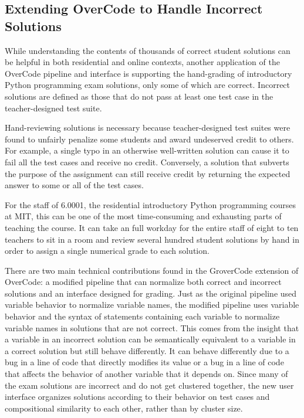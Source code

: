 \subsection{Extending OverCode to Handle Incorrect Solutions}\label{sec:grover}

While understanding the contents of thousands of correct student solutions can be helpful in both residential and online contexts, another application of the OverCode pipeline and interface is supporting the hand-grading of introductory Python programming exam solutions, only some of which are correct. Incorrect solutions are defined as those that do not pass at least one test case in the teacher-designed test suite.

Hand-reviewing solutions is necessary because teacher-designed test suites were found to unfairly penalize some students and award undeserved credit to others. For example, a single typo in an otherwise well-written solution can cause it to fail all the test cases and receive no credit. Conversely, a solution that subverts the purpose of the assignment can still receive credit by returning the expected answer to some or all of the test cases.

For the staff of 6.0001, the residential introductory Python programming courses at MIT, this can be one of the most time-consuming and exhausting parts of teaching the course. It can take an full workday for the entire staff of eight to ten teachers to sit in a room and review several hundred student solutions by hand in order to assign a single numerical grade to each solution. 

There are two main technical contributions found in the GroverCode extension of OverCode: a modified pipeline that can normalize both correct and incorrect solutions and an interface designed for grading. Just as the original pipeline used variable behavior to normalize variable names, the modified pipeline uses variable behavior and the syntax of statements containing each variable to normalize variable names in solutions that are not correct. This comes from the insight that a variable in an incorrect solution can be semantically equivalent to a variable in a correct solution but still behave differently. It can behave differently due to a bug in a line of code that directly modifies its value or a bug in a line of code that affects the behavior of another variable that it depends on. Since many of the exam solutions are incorrect and do not get clustered together, the new user interface organizes solutions according to their behavior on test cases and compositional similarity to each other, rather than by cluster size.

